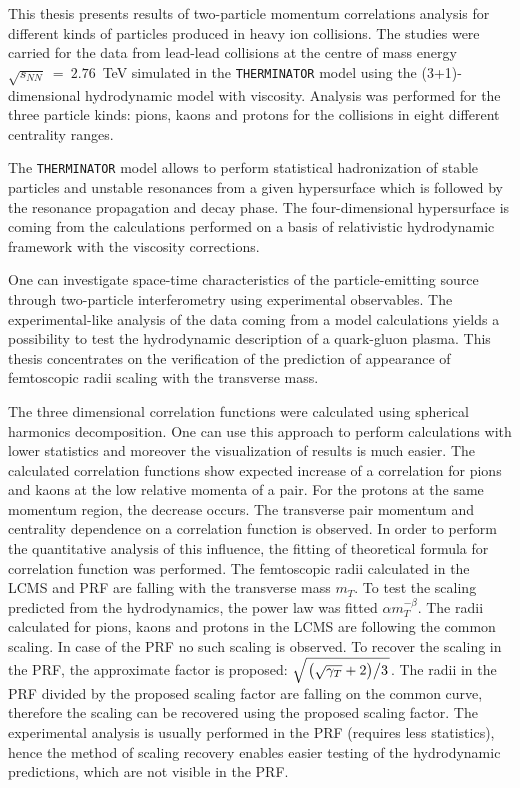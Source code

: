 
This thesis presents results of two-particle momentum correlations analysis for different kinds of particles produced in heavy ion collisions.
The studies were carried for the data from lead-lead collisions at the centre of mass energy $\sqrt{s_{NN}}~=~2.76$~TeV simulated in the \verb|THERMINATOR| model using the (3+1)-dimensional hydrodynamic model with viscosity.
Analysis was performed for the three particle kinds: pions, kaons and protons for the collisions in eight different centrality ranges.

The \verb|THERMINATOR| model allows to perform statistical hadronization of stable particles and unstable resonances from a given hypersurface which is followed by the resonance propagation and decay phase.
The four-dimensional hypersurface is coming from the calculations performed on a basis of relativistic hydrodynamic framework with the viscosity corrections.

One can investigate space-time characteristics of the particle-emitting source through two-particle interferometry using experimental observables.
The experimental-like analysis of the data coming from a model calculations yields a possibility to test the hydrodynamic description of a quark-gluon plasma.
This thesis concentrates on the verification of the prediction of appearance of femtoscopic radii scaling with the transverse mass.

The three dimensional correlation functions were calculated using spherical harmonics decomposition.
One can use this approach to perform calculations with lower statistics and moreover the visualization of results is much easier.
The calculated correlation functions show expected increase of a correlation for pions and kaons at the low relative momenta of a pair.
For the protons at the same momentum region, the decrease occurs.
The transverse pair momentum and centrality dependence on a correlation function is observed.
In order to perform the quantitative analysis of this influence, the fitting of theoretical formula for correlation function was performed.
The femtoscopic radii calculated in the LCMS and PRF are falling with the transverse mass $m_T$.
To test the scaling predicted from the hydrodynamics, the power law was fitted $\alpha m_T^{-\beta}$.
The radii calculated for pions, kaons and protons in the LCMS are following the common scaling.
In case of the PRF no such scaling is observed.
To recover the scaling in the PRF, the approximate factor is proposed: $\sqrt{ \left. \left( \sqrt{\gamma_T} + 2 \right) \middle/ 3 \right. }$.
The radii in the PRF divided by the proposed scaling factor are falling on the common curve, therefore the scaling can be recovered using the proposed scaling factor.
The experimental analysis is usually performed in the PRF (requires less statistics), hence the method of scaling recovery enables easier testing of the hydrodynamic predictions, which are not visible in the PRF.
